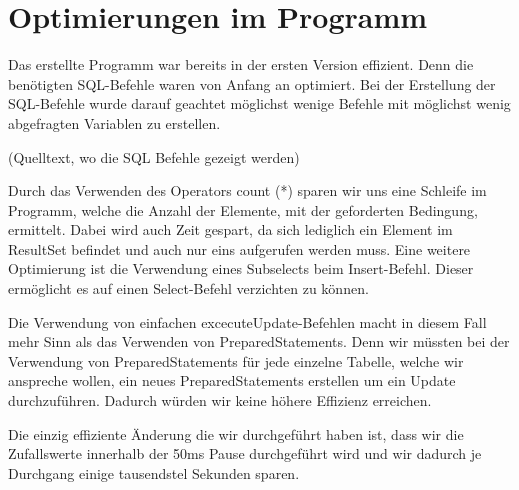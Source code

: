 \section{Optimierungen im Programm}
Das erstellte Programm war bereits in der ersten Version effizient. Denn die
benötigten SQL-Befehle waren von Anfang an optimiert. Bei der Erstellung der
SQL-Befehle wurde darauf geachtet möglichst wenige Befehle mit möglichst wenig
abgefragten Variablen  zu erstellen.

(Quelltext, wo die SQL Befehle gezeigt werden)

Durch das Verwenden des Operators count (*) sparen wir uns eine Schleife im
Programm, welche die Anzahl der Elemente, mit der geforderten Bedingung,
ermittelt. Dabei wird auch Zeit gespart, da sich lediglich ein Element im
ResultSet befindet und auch nur eins aufgerufen werden muss. Eine weitere
Optimierung ist die Verwendung eines Subselects beim Insert-Befehl. Dieser
ermöglicht es auf einen Select-Befehl verzichten zu können.

Die Verwendung von einfachen excecuteUpdate-Befehlen macht in diesem Fall mehr
Sinn als das Verwenden von PreparedStatements. Denn wir müssten bei der
Verwendung von PreparedStatements für jede einzelne Tabelle, welche wir
anspreche wollen, ein neues PreparedStatements erstellen um ein Update
durchzuführen. Dadurch würden wir keine höhere Effizienz erreichen.

Die einzig effiziente Änderung die wir durchgeführt haben ist, dass wir die
Zufallswerte innerhalb der 50ms Pause durchgeführt wird und wir dadurch je
Durchgang einige tausendstel Sekunden sparen.

\clearpage
